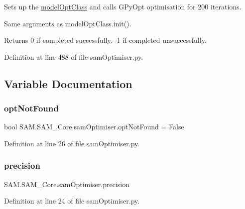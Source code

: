 Sets up the \hyperlink{group__icubclient__SAM__Core_classSAM_1_1SAM__Core_1_1samOptimiser_1_1modelOptClass}{model\+Opt\+Class} and calls G\+Py\+Opt optimisation for 200 iterations. 

Same arguments as model\+Opt\+Class.\+init().

\begin{DoxyReturn}{Returns}
0 if completed successfully. -\/1 if completed unsuccessfully. 
\end{DoxyReturn}


Definition at line 488 of file sam\+Optimiser.\+py.



\subsection{Variable Documentation}
\mbox{\label{namespaceSAM_1_1SAM__Core_1_1samOptimiser_a5711439302add7b6791b1fb732529f06}} 
\subsubsection{\texorpdfstring{opt\+Not\+Found}{optNotFound}}
{\footnotesize\ttfamily bool S\+A\+M.\+S\+A\+M\+\_\+\+Core.\+sam\+Optimiser.\+opt\+Not\+Found = False}



Definition at line 26 of file sam\+Optimiser.\+py.

\mbox{\label{namespaceSAM_1_1SAM__Core_1_1samOptimiser_a9dbac1c83d2aee8db8fe3a941547e71e}} 
\subsubsection{\texorpdfstring{precision}{precision}}
{\footnotesize\ttfamily S\+A\+M.\+S\+A\+M\+\_\+\+Core.\+sam\+Optimiser.\+precision}



Definition at line 24 of file sam\+Optimiser.\+py.

